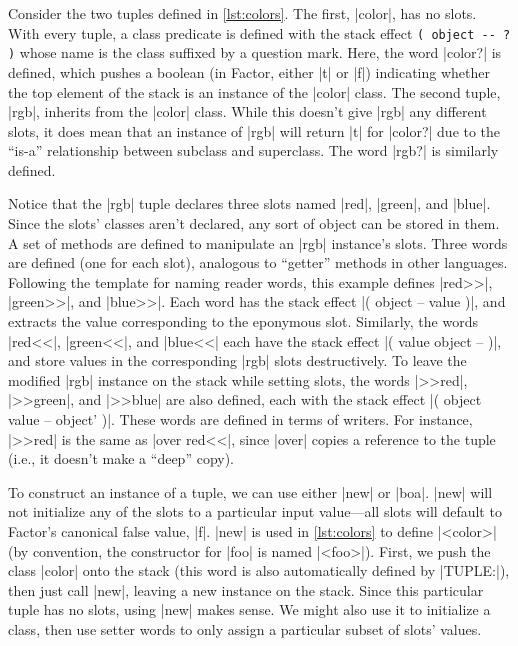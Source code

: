 
Consider the two tuples defined in \vref{lst:colors}.  The first,
\factor|color|, has no slots.  With every tuple, a class predicate is defined
with the stack effect
%
\verb|( object -- ? )|
%
whose name is the class suffixed by a question mark.  Here, the word
\factor|color?| is defined, which pushes a boolean (in Factor, either
\factor|t| or \factor|f|) indicating whether the top element of the stack is an
instance of the \factor|color| class.  The second tuple, \factor|rgb|, inherits
from the \factor|color| class.  While this doesn't give \factor|rgb| any
different slots, it does mean that an instance of \factor|rgb| will return
\factor|t| for \factor|color?| due to the ``is-a'' relationship between
subclass and superclass.  The word \factor|rgb?| is similarly defined.

Notice that the \factor|rgb| tuple declares three slots named \factor|red|,
\factor|green|, and \factor|blue|.  Since the slots' classes aren't declared,
any sort of object can be stored in them.  A set of methods are defined to
manipulate an \factor|rgb| instance's slots.  Three  words are
defined (one for each slot), analogous to ``getter'' methods in other
languages.  Following the template for naming reader words, this example
defines \factor|red>>|, \factor|green>>|, and \factor|blue>>|.  Each word has
the stack effect
%
\factor|( object -- value )|,
%
and extracts the value corresponding to the eponymous slot.  Similarly, the
 words \factor|red<<|, \factor|green<<|, and \factor|blue<<| each
have the stack effect
%
\factor|( value object -- )|,
%
and store values in the corresponding \factor|rgb| slots destructively.  To
leave the modified \factor|rgb| instance on the stack while setting slots, the
 words \factor|>>red|, \factor|>>green|, and \factor|>>blue| are
also defined, each with the stack effect
%
\factor|( object value -- object' )|.
%
These words are defined in terms of writers.  For instance, \factor|>>red| is
the same as \factor|over red<<|, since \factor|over| copies a reference to the
tuple (i.e., it doesn't make a ``deep'' copy).

To construct an instance of a tuple, we can use either \factor|new| or
\factor|boa|.  \factor|new| will not initialize any of the slots to a
particular input value---all slots will default to Factor's canonical false
value, \factor|f|.  \factor|new| is used in \vref{lst:colors} to define
\factor|<color>| (by convention, the constructor for \factor|foo| is named
\factor|<foo>|).  First, we push the class \factor|color| onto the stack (this
word is also automatically defined by \factor|TUPLE:|), then just call
\factor|new|, leaving a new instance on the stack.  Since this particular tuple
has no slots, using \factor|new| makes sense.  We might also use it to
initialize a class, then use setter words to only assign a particular subset of
slots' values.


